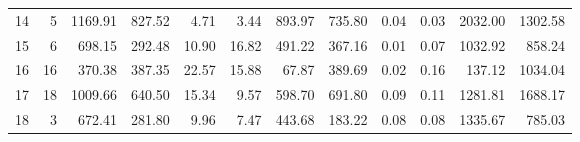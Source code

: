 \begin{tabular}{lrrrrrrrrrrr}
14     &   5 &    1169.91 &    827.52 &        4.71 &       3.44 &      893.97 &     735.80 &       0.04 &      0.03 &        2032.00 &       1302.58 \\
15     &   6 &     698.15 &    292.48 &       10.90 &      16.82 &      491.22 &     367.16 &       0.01 &      0.07 &        1032.92 &        858.24 \\
16     &  16 &     370.38 &    387.35 &       22.57 &      15.88 &       67.87 &     389.69 &       0.02 &      0.16 &         137.12 &       1034.04 \\
17     &  18 &    1009.66 &    640.50 &       15.34 &       9.57 &      598.70 &     691.80 &       0.09 &      0.11 &        1281.81 &       1688.17 \\
18     &   3 &     672.41 &    281.80 &        9.96 &       7.47 &      443.68 &     183.22 &       0.08 &      0.08 &        1335.67 &        785.03 \\
\bottomrule
\end{tabular}
